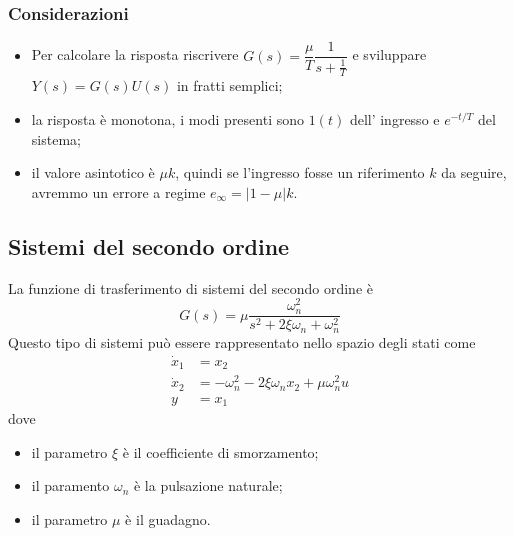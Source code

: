 \documentclass{article}
\numberwithin{equation}{subsection}
\let\oldsubsection\subsection%
\renewcommand{\subsection}{%
  \renewcommand{\theequation}{\thesubsection.\arabic{equation}}%
  \oldsubsection}%
\begin{document}
\subsubsection{Considerazioni}
\begin{itemize}
    \item Per calcolare la risposta riscrivere $G(s) = \dfrac{\mu}{T} \dfrac{1}{s+\frac{1}{T}}$ e sviluppare $Y (s) = G(s)U (s)$ in fratti semplici;
   \item la risposta è monotona, i modi presenti sono $1(t)$ dell' ingresso e $e^{-t/T}$ del sistema;
   \item il valore asintotico è $\mu k$, quindi se l'ingresso fosse un riferimento $k$ da seguire, avremmo un errore a regime $e_{\infty} = |1-\mu|k$.
\end{itemize}




\subsection{Sistemi del secondo ordine}
La funzione di trasferimento di sistemi del secondo ordine è 
\begin{equation}
    G(s) = \mu\frac{\omega^2_n}{s^2+2 \xi \omega_n + \omega^2_n}
\end{equation}
Questo tipo di sistemi può essere rappresentato nello spazio degli stati come
\begin{align*}
    \dot x_1 &= x_2\\
    \dot x_2 &= - \omega^2_n - 2 \xi \omega_nx_2 + \mu \omega^2_n u\\
    y &= x_1
\end{align*}
dove
\begin{itemize}
    \item il parametro $\xi$ è il coefficiente di smorzamento;
    \item il paramento $\omega_n$ è la pulsazione naturale;
    \item il parametro $\mu$ è il guadagno.
\end{itemize}
\end{document}
